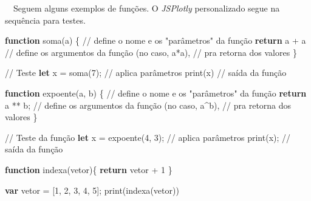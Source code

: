 \documentclass[
  portuguese,
  letterpaper,
  DIV=11,
  numbers=noendperiod]{scrreprt}
\newenvironment{Shaded}{\begin{snugshade}}{\end{snugshade}}
\newcommand{\CommentTok}[1]{\textcolor[rgb]{0.37,0.37,0.37}{#1}}
\newcommand{\ControlFlowTok}[1]{\textcolor[rgb]{0.00,0.23,0.31}{\textbf{#1}}}
\newcommand{\DecValTok}[1]{\textcolor[rgb]{0.68,0.00,0.00}{#1}}
\newcommand{\FunctionTok}[1]{\textcolor[rgb]{0.28,0.35,0.67}{#1}}
\newcommand{\KeywordTok}[1]{\textcolor[rgb]{0.00,0.23,0.31}{\textbf{#1}}}
\newcommand{\NormalTok}[1]{\textcolor[rgb]{0.00,0.23,0.31}{#1}}
\newcommand{\OperatorTok}[1]{\textcolor[rgb]{0.37,0.37,0.37}{#1}}
\begin{document}
~~Seguem alguns exemplos de funções. O \emph{JSPlotly} personalizado
segue na sequência para testes.

\begin{Shaded}
\begin{Highlighting}[]
\KeywordTok{function} \FunctionTok{soma}\NormalTok{(a) \{ }\CommentTok{// define o nome e os "parâmetros" da função}
 \ControlFlowTok{return}\NormalTok{ a }\OperatorTok{+}\NormalTok{ a }\CommentTok{// define os argumentos da função (no caso, a*a),}
            \CommentTok{// pra retorna dos valores}
\NormalTok{\}}

\CommentTok{// Teste}
\KeywordTok{let}\NormalTok{ x }\OperatorTok{=} \FunctionTok{soma}\NormalTok{(}\DecValTok{7}\NormalTok{)}\OperatorTok{;} \CommentTok{// aplica parâmetros}
\FunctionTok{print}\NormalTok{(x) }\CommentTok{// saída da função}
\end{Highlighting}
\end{Shaded}

\hfill\break

\begin{Shaded}
\begin{Highlighting}[]

\KeywordTok{function} \FunctionTok{expoente}\NormalTok{(a}\OperatorTok{,}\NormalTok{ b) \{ }\CommentTok{// define o nome e os "parâmetros" da função}
  \ControlFlowTok{return}\NormalTok{ a }\OperatorTok{**}\NormalTok{ b}\OperatorTok{;}  \CommentTok{// define os argumentos da função (no caso, a\^{}b),}
                  \CommentTok{// pra retorna dos valores}
\NormalTok{\}}

\CommentTok{// Teste da função}
\KeywordTok{let}\NormalTok{ x }\OperatorTok{=} \FunctionTok{expoente}\NormalTok{(}\DecValTok{4}\OperatorTok{,} \DecValTok{3}\NormalTok{)}\OperatorTok{;} \CommentTok{// aplica parâmetros}
\FunctionTok{print}\NormalTok{(x)}\OperatorTok{;}         \CommentTok{// saída da função}
\end{Highlighting}
\end{Shaded}

\hfill\break

\begin{Shaded}
\begin{Highlighting}[]
\KeywordTok{function} \FunctionTok{indexa}\NormalTok{(vetor)\{}
 \ControlFlowTok{return}\NormalTok{ vetor }\OperatorTok{+} \DecValTok{1}
\NormalTok{\}}

\KeywordTok{var}\NormalTok{ vetor }\OperatorTok{=}\NormalTok{ [}\DecValTok{1}\OperatorTok{,} \DecValTok{2}\OperatorTok{,} \DecValTok{3}\OperatorTok{,} \DecValTok{4}\OperatorTok{,} \DecValTok{5}\NormalTok{]}\OperatorTok{;}
\FunctionTok{print}\NormalTok{(}\FunctionTok{indexa}\NormalTok{(vetor))}
\end{Highlighting}
\end{Shaded}
\end{document}
